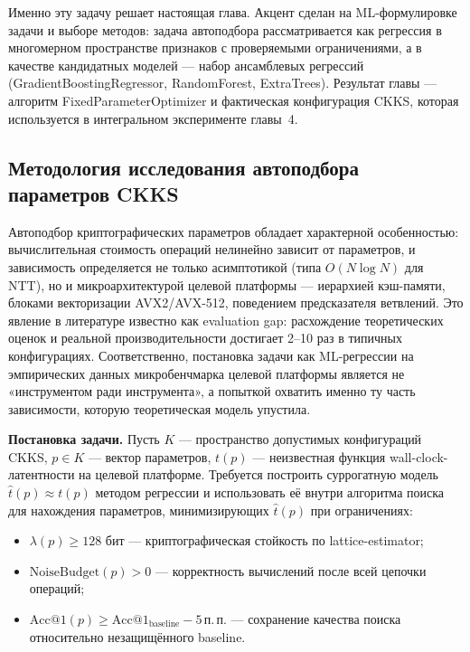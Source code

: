 \documentclass[a4paper, 12pt, oneside, openany]{article}
\begin{document}
Именно эту задачу решает настоящая глава. Акцент сделан на ML-формулировке задачи и выборе методов: задача автоподбора рассматривается как регрессия в многомерном пространстве признаков с проверяемыми ограничениями, а в качестве кандидатных моделей --- набор ансамблевых регрессий (GradientBoostingRegressor, RandomForest, ExtraTrees). Результат главы --- алгоритм FixedParameterOptimizer и фактическая конфигурация CKKS, которая используется в интегральном эксперименте главы~4.

\subsection{Методология исследования автоподбора параметров CKKS}\label{subsec:autotune-methodology}

Автоподбор криптографических параметров обладает характерной особенностью: вычислительная стоимость операций нелинейно зависит от параметров, и зависимость определяется не только асимптотикой (типа $O(N \log N)$ для NTT), но и микроархитектурой целевой платформы --- иерархией кэш-памяти, блоками векторизации AVX2/AVX-512, поведением предсказателя ветвлений. Это явление в литературе известно как evaluation gap: расхождение теоретических оценок и реальной производительности достигает 2--10 раз в типичных конфигурациях. Соответственно, постановка задачи как ML-регрессии на эмпирических данных микробенчмарка целевой платформы является не «инструментом ради инструмента», а попыткой охватить именно ту часть зависимости, которую теоретическая модель упустила.

\textbf{Постановка задачи.} Пусть $K$ --- пространство допустимых конфигураций CKKS, $p \in K$ --- вектор параметров, $t(p)$ --- неизвестная функция wall-clock-латентности на целевой платформе. Требуется построить суррогатную модель $\widehat{t}(p) \approx t(p)$ методом регрессии и использовать её внутри алгоритма поиска для нахождения параметров, минимизирующих $\widehat{t}(p)$ при ограничениях:
\begin{itemize}
	\item $\lambda(p) \geq 128$ бит --- криптографическая стойкость по lattice-estimator;
	\item $\mathrm{NoiseBudget}(p) > 0$ --- корректность вычислений после всей цепочки операций;
	\item $\mathrm{Acc@1}(p) \geq \mathrm{Acc@1}_{\text{baseline}} - 5$\,п.\,п. --- сохранение качества поиска относительно незащищённого baseline.
\end{itemize}
\end{document}
